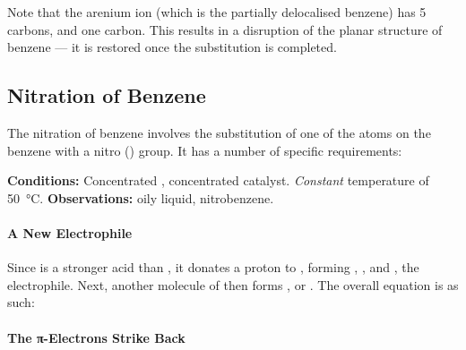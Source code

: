 		Note that the arenium ion (which is the partially delocalised benzene) has 5 \sptwo carbons, and one \spthree carbon. This
		results in a disruption of the planar structure of benzene --- it is restored once the substitution is completed.




		\pagebreak
		\subsection{Nitration of Benzene}

			The nitration of benzene involves the substitution of one of the  atoms on the benzene with a nitro () group.
			It has a number of specific requirements:

			\vspace{1.5em}
			\vbox{\textbf{Conditions:}	\tabto{35mm}Concentrated , concentrated  catalyst.
										\tabto{35mm}\textit{Constant} temperature of \SI{50}{\celsius}.}
			\vspace{0.75em}
			\vbox{\textbf{Observations:}\tabto{35mm} oily liquid, nitrobenzene.}


			\vspace{1.0em}
			\paragraph{A New Electrophile}

			Since  is a stronger acid than , it donates a proton to , forming , , and , the
			electrophile. Next, another molecule of  then forms , or . The overall equation is as such:




			\paragraph{The π-Electrons Strike Back}

